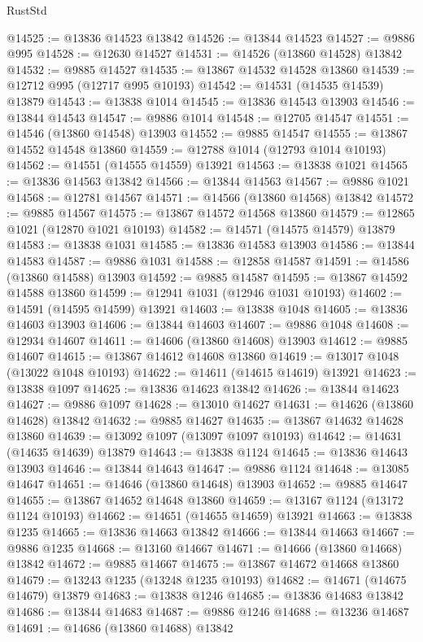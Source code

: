 \begin{lexlean}{RustStd}
\begin{coremodule}
@14525 := @13836 @14523 @13842
@14526 := @13844 @14523
@14527 := @9886 @995
@14528 := @12630 @14527
@14531 := @14526 (@13860 @14528) @13842
@14532 := @9885 @14527
@14535 := @13867 @14532 @14528 @13860
@14539 := @12712 @995 (@12717 @995 @10193)
@14542 := @14531 (@14535 @14539) @13879
@14543 := @13838 @1014
@14545 := @13836 @14543 @13903
@14546 := @13844 @14543
@14547 := @9886 @1014
@14548 := @12705 @14547
@14551 := @14546 (@13860 @14548) @13903
@14552 := @9885 @14547
@14555 := @13867 @14552 @14548 @13860
@14559 := @12788 @1014 (@12793 @1014 @10193)
@14562 := @14551 (@14555 @14559) @13921
@14563 := @13838 @1021
@14565 := @13836 @14563 @13842
@14566 := @13844 @14563
@14567 := @9886 @1021
@14568 := @12781 @14567
@14571 := @14566 (@13860 @14568) @13842
@14572 := @9885 @14567
@14575 := @13867 @14572 @14568 @13860
@14579 := @12865 @1021 (@12870 @1021 @10193)
@14582 := @14571 (@14575 @14579) @13879
@14583 := @13838 @1031
@14585 := @13836 @14583 @13903
@14586 := @13844 @14583
@14587 := @9886 @1031
@14588 := @12858 @14587
@14591 := @14586 (@13860 @14588) @13903
@14592 := @9885 @14587
@14595 := @13867 @14592 @14588 @13860
@14599 := @12941 @1031 (@12946 @1031 @10193)
@14602 := @14591 (@14595 @14599) @13921
@14603 := @13838 @1048
@14605 := @13836 @14603 @13903
@14606 := @13844 @14603
@14607 := @9886 @1048
@14608 := @12934 @14607
@14611 := @14606 (@13860 @14608) @13903
@14612 := @9885 @14607
@14615 := @13867 @14612 @14608 @13860
@14619 := @13017 @1048 (@13022 @1048 @10193)
@14622 := @14611 (@14615 @14619) @13921
@14623 := @13838 @1097
@14625 := @13836 @14623 @13842
@14626 := @13844 @14623
@14627 := @9886 @1097
@14628 := @13010 @14627
@14631 := @14626 (@13860 @14628) @13842
@14632 := @9885 @14627
@14635 := @13867 @14632 @14628 @13860
@14639 := @13092 @1097 (@13097 @1097 @10193)
@14642 := @14631 (@14635 @14639) @13879
@14643 := @13838 @1124
@14645 := @13836 @14643 @13903
@14646 := @13844 @14643
@14647 := @9886 @1124
@14648 := @13085 @14647
@14651 := @14646 (@13860 @14648) @13903
@14652 := @9885 @14647
@14655 := @13867 @14652 @14648 @13860
@14659 := @13167 @1124 (@13172 @1124 @10193)
@14662 := @14651 (@14655 @14659) @13921
@14663 := @13838 @1235
@14665 := @13836 @14663 @13842
@14666 := @13844 @14663
@14667 := @9886 @1235
@14668 := @13160 @14667
@14671 := @14666 (@13860 @14668) @13842
@14672 := @9885 @14667
@14675 := @13867 @14672 @14668 @13860
@14679 := @13243 @1235 (@13248 @1235 @10193)
@14682 := @14671 (@14675 @14679) @13879
@14683 := @13838 @1246
@14685 := @13836 @14683 @13842
@14686 := @13844 @14683
@14687 := @9886 @1246
@14688 := @13236 @14687
@14691 := @14686 (@13860 @14688) @13842

\end{coremodule}
\end{lexlean}
